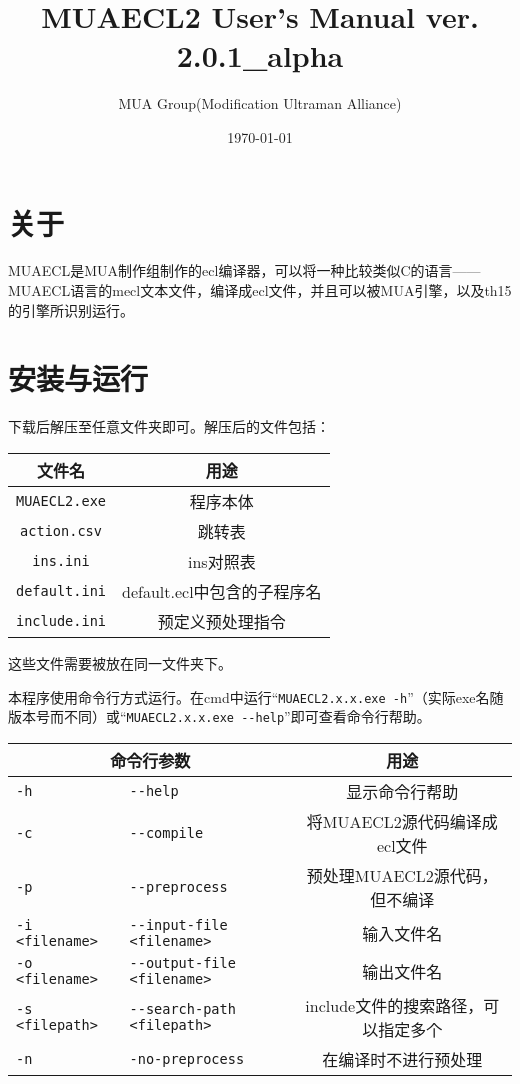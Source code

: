 \documentclass[UTF8]{ctexart}
\author{MUA Group(Modification Ultraman Alliance)}
\title{MUAECL2 User's Manual  ver. 2.0.1\_alpha}
\date{\today}
\begin{document}
\maketitle
\tableofcontents
\clearpage

\section{关于}

MUAECL是MUA制作组制作的ecl编译器，可以将一种比较类似C的语言——MUAECL语言的mecl文本文件，编译成ecl文件，并且可以被MUA引擎，以及th15的引擎所识别运行。

\section{安装与运行}

下载后解压至任意文件夹即可。解压后的文件包括：

\begin{table}[H]
	\centering
	\begin{tabular}{c|c}
		\hline
		文件名 & 用途 \\\hline
		\verb|MUAECL2.exe| & 程序本体 \\\hline
		\verb|action.csv| & 跳转表 \\\hline
		\verb|ins.ini| & ins对照表 \\\hline
		\verb|default.ini| & default.ecl中包含的子程序名 \\\hline
		\verb|include.ini| & 预定义预处理指令 \\\hline
	\end{tabular}
\end{table}

这些文件需要被放在同一文件夹下。

本程序使用命令行方式运行。在cmd中运行``\verb|MUAECL2.x.x.exe -h|''（实际exe名随版本号而不同）或``\verb|MUAECL2.x.x.exe --help|''即可查看命令行帮助。

\begin{table}[H]
	\centering
	\begin{tabular}{l|l|c}
		\hline
		\multicolumn{2}{c|}{命令行参数} & 用途 \\\hline
		\verb|-h| & \verb|--help| & 显示命令行帮助 \\\hline
		\verb|-c| & \verb|--compile| & 将MUAECL2源代码编译成ecl文件 \\\hline
		\verb|-p| & \verb|--preprocess| & 预处理MUAECL2源代码，但不编译 \\\hline
		\verb|-i <filename>| & \verb|--input-file <filename>| & 输入文件名 \\\hline
		\verb|-o <filename>| & \verb|--output-file <filename>| & 输出文件名 \\\hline
		\verb|-s <filepath>| & \verb|--search-path <filepath>| & include文件的搜索路径，可以指定多个 \\\hline
		\verb|-n| & \verb|-no-preprocess| & 在编译时不进行预处理 \\\hline
	\end{tabular}
\end{table}
\end{document}
